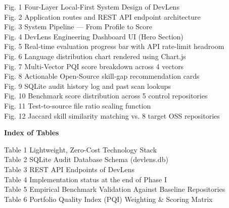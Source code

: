 \documentclass[12pt,a4paper]{article}
\begin{document}
\noindent Fig. 1 \hspace{0.2cm} Four-Layer Local-First System Design of DevLens  \\
Fig. 2 \hspace{0.2cm} Application routes and REST API endpoint architecture  \\
Fig. 3 \hspace{0.2cm} System Pipeline --- From Profile to Score  \\
Fig. 4 \hspace{0.2cm} DevLens Engineering Dashboard UI (Hero Section)  \\
Fig. 5 \hspace{0.2cm} Real-time evaluation progress bar with API rate-limit headroom  \\
Fig. 6 \hspace{0.2cm} Language distribution chart rendered using Chart.js  \\
Fig. 7 \hspace{0.2cm} Multi-Vector PQI score breakdown across 4 vectors  \\
Fig. 8 \hspace{0.2cm} Actionable Open-Source skill-gap recommendation cards  \\
Fig. 9 \hspace{0.2cm} SQLite audit history log and past scan lookups  \\
Fig. 10 \hspace{0.2cm} Benchmark score distribution across 5 control repositories  \\
Fig. 11 \hspace{0.2cm} Test-to-source file ratio scaling function  \\
Fig. 12 \hspace{0.2cm} Jaccard skill similarity matching vs. 8 target OSS repositories 

\vspace{0.8cm}
\begin{center}
    {\fontsize{13pt}{15pt}\bfseries Index of Tables \par}
\end{center}
\vspace{0.3cm}

\noindent Table 1 \hspace{0.2cm} Lightweight, Zero-Cost Technology Stack  \\
Table 2 \hspace{0.2cm} SQLite Audit Database Schema (devlens.db)  \\
Table 3 \hspace{0.2cm} REST API Endpoints of DevLens  \\
Table 4 \hspace{0.2cm} Implementation status at the end of Phase I  \\
Table 5 \hspace{0.2cm} Empirical Benchmark Validation Against Baseline Repositories  \\
Table 6 \hspace{0.2cm} Portfolio Quality Index (PQI) Weighting & Scoring Matrix 
\end{document}
